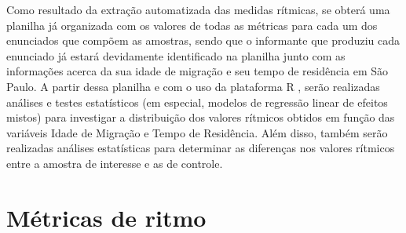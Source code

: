 \documentclass[
		a4paper,	%
		12pt,		%
		]{article}	%
\begin{document}
	Como resultado da extração automatizada das medidas rítmicas, se obterá uma
	planilha já organizada com os valores de todas as métricas para cada um dos
	enunciados que compõem as amostras, sendo que o informante que produziu cada
	enunciado já estará devidamente identificado na planilha junto com as
	informações acerca da sua idade de migração e seu tempo de residência em São
	Paulo. A partir dessa planilha e com o uso da plataforma R
	\citep{RCoreTeam2019}, serão realizadas análises e testes estatísticos (em
	especial, modelos de regressão linear de efeitos mistos) para investigar a
	distribuição dos valores rítmicos obtidos em função das variáveis Idade de
	Migração e Tempo de Residência. Além disso, também serão realizadas análises
	estatísticas para determinar as diferenças nos valores rítmicos entre a
	amostra de interesse e as de controle. 
	
	{ %
		\printbibliography
	}

\pagebreak

\appendix
\section{Métricas de ritmo}
\end{document}
